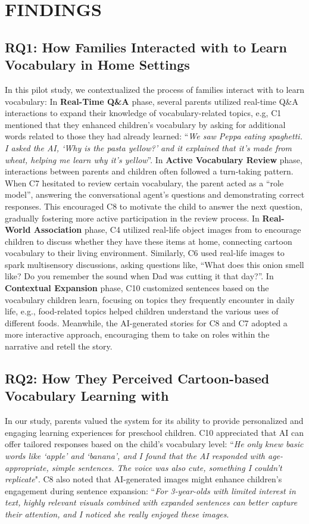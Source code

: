 \section{FINDINGS}
\subsection{RQ1: How Families Interacted with \name{} to Learn Vocabulary in Home Settings}
In this pilot study, we contextualized the process of families interact with \name{} to learn vocabulary: In \textbf{Real-Time Q\&A} phase, several parents utilized real-time Q\&A interactions to expand their knowledge of vocabulary-related topics, e.g, C1 mentioned that they enhanced children's vocabulary by asking for additional words related to those they had already learned: ``\textit{We saw Peppa eating spaghetti. I asked the AI, `Why is the pasta yellow?' and it explained that it's made from wheat, helping me learn why it's yellow}''. In \textbf{Active Vocabulary Review} phase, interactions between parents and children often followed a turn-taking pattern. When C7 hesitated to review certain vocabulary, the parent acted as a ``role model'', answering the conversational agent's questions and demonstrating correct responses. This encouraged C8 to motivate the child to answer the next question, gradually fostering more active participation in the review process. In \textbf{Real-World Association} phase, C4 utilized real-life object images from \name{} to encourage children to discuss whether they have these items at home, connecting cartoon vocabulary to their living environment. Similarly, C6 used real-life images to spark multisensory discussions, asking questions like, ``What does this onion smell like? Do you remember the sound when Dad was cutting it that day?''. In \textbf{Contextual Expansion} phase, C10 customized sentences based on the vocabulary children learn, focusing on topics they frequently encounter in daily life, e.g., food-related topics helped children understand the various uses of different foods. Meanwhile, the AI-generated stories for C8 and C7 adopted a more interactive approach, encouraging them to take on roles within the narrative and retell the story.

\subsection{RQ2: How They Perceived Cartoon-based Vocabulary Learning with \name{}}
In our study, parents valued the system for its ability to provide personalized and engaging learning experiences for preschool children. 
C10 appreciated that AI can offer tailored responses based on the child's vocabulary level: ``\textit{He only knew basic words like `apple' and `banana', and I found that the AI responded with age-appropriate, simple sentences. The voice was also cute, something I couldn't replicate}".
C8 also noted that AI-generated images might enhance children's engagement during sentence expansion: ``\textit{For 3-year-olds with limited interest in text, highly relevant visuals combined with expanded sentences can better capture their attention, and I noticed she really enjoyed these images}.

